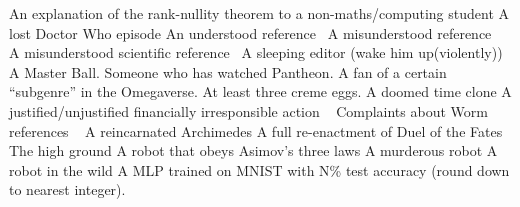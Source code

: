 \begin{multicols}{2}
\begin{small}
\begin{tabbing}
            {An explanation of the rank-nullity theorem to a non-maths/computing student}
           {A lost Doctor Who episode}
           {An understood reference~\E}
          {A misunderstood reference~\E}
         {A misunderstood scientific reference~\E}
            {A sleeping editor (wake him up(violently))}
        {A Master Ball.}
        {Someone who has watched Pantheon.}
          {A fan of a certain ``subgenre'' in the Omegaverse.}
           {At least three creme eggs.}
            {A doomed time clone}
             {A justified/unjustified financially irresponsible action ~\FD}
             {Complaints about Worm references ~\E}
             {A reincarnated Archimedes}
            {A full re-enactment of Duel of the Fates}
               {The high ground}
              {A robot that obeys Asimov's three laws}
           {A murderous robot}
           {A robot in the wild}
        {A MLP trained on MNIST with N\% test accuracy (round down to nearest integer). ~\M}

\end{tabbing}
\end{small}
\end{multicols}
